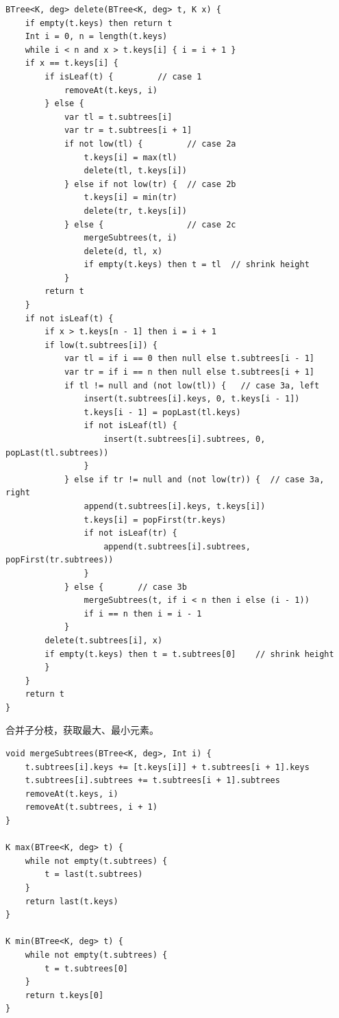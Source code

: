 \documentclass{ctexart}
\begin{document}
\begin{lstlisting}[language = Bourbaki]
BTree<K, deg> delete(BTree<K, deg> t, K x) {
    if empty(t.keys) then return t
    Int i = 0, n = length(t.keys)
    while i < n and x > t.keys[i] { i = i + 1 }
    if x == t.keys[i] {
        if isLeaf(t) {         // case 1
            removeAt(t.keys, i)
        } else {
            var tl = t.subtrees[i]
            var tr = t.subtrees[i + 1]
            if not low(tl) {         // case 2a
                t.keys[i] = max(tl)
                delete(tl, t.keys[i])
            } else if not low(tr) {  // case 2b
                t.keys[i] = min(tr)
                delete(tr, t.keys[i])
            } else {                 // case 2c
                mergeSubtrees(t, i)
                delete(d, tl, x)
                if empty(t.keys) then t = tl  // shrink height
            }
        return t
    }
    if not isLeaf(t) {
        if x > t.keys[n - 1] then i = i + 1
        if low(t.subtrees[i]) {
            var tl = if i == 0 then null else t.subtrees[i - 1]
            var tr = if i == n then null else t.subtrees[i + 1]
            if tl != null and (not low(tl)) {   // case 3a, left
                insert(t.subtrees[i].keys, 0, t.keys[i - 1])
                t.keys[i - 1] = popLast(tl.keys)
                if not isLeaf(tl) {
                    insert(t.subtrees[i].subtrees, 0, popLast(tl.subtrees))
                }
            } else if tr != null and (not low(tr)) {  // case 3a, right
                append(t.subtrees[i].keys, t.keys[i])
                t.keys[i] = popFirst(tr.keys)
                if not isLeaf(tr) {
                    append(t.subtrees[i].subtrees, popFirst(tr.subtrees))
                }
            } else {       // case 3b
                mergeSubtrees(t, if i < n then i else (i - 1))
                if i == n then i = i - 1
            }
        delete(t.subtrees[i], x)
        if empty(t.keys) then t = t.subtrees[0]    // shrink height
        }
    }
    return t
}
\end{lstlisting}

合并子分枝，获取最大、最小元素。

\begin{lstlisting}[language = Bourbaki]
void mergeSubtrees(BTree<K, deg>, Int i) {
    t.subtrees[i].keys += [t.keys[i]] + t.subtrees[i + 1].keys
    t.subtrees[i].subtrees += t.subtrees[i + 1].subtrees
    removeAt(t.keys, i)
    removeAt(t.subtrees, i + 1)
}

K max(BTree<K, deg> t) {
    while not empty(t.subtrees) {
        t = last(t.subtrees)
    }
    return last(t.keys)
}

K min(BTree<K, deg> t) {
    while not empty(t.subtrees) {
        t = t.subtrees[0]
    }
    return t.keys[0]
}
\end{lstlisting}
\end{document}
